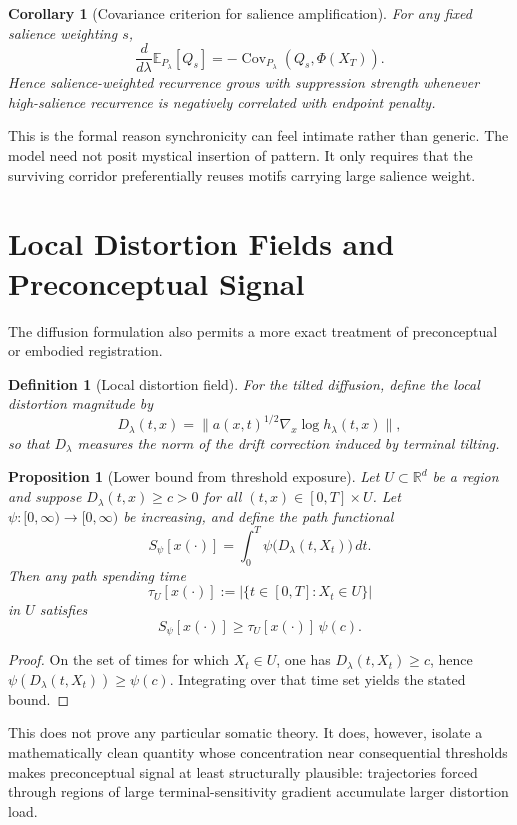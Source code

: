 \documentclass[12pt]{article}
\newtheorem{definition}{Definition}
\newtheorem{proposition}{Proposition}
\newtheorem{corollary}{Corollary}
\begin{document}
\begin{corollary}[Covariance criterion for salience amplification]
For any fixed salience weighting $s$,
\[
\frac{d}{d\lambda}\mathbb E_{P_\lambda}[Q_s]
= -\operatorname{Cov}_{P_\lambda}(Q_s,\Phi(X_T)).
\]
Hence salience-weighted recurrence grows with suppression strength whenever high-salience recurrence is negatively correlated with endpoint penalty.
\end{corollary}

This is the formal reason synchronicity can feel intimate rather than generic. The model need not posit mystical insertion of pattern. It only requires that the surviving corridor preferentially reuses motifs carrying large salience weight.

\section{Local Distortion Fields and Preconceptual Signal}

The diffusion formulation also permits a more exact treatment of preconceptual or embodied registration.

\begin{definition}[Local distortion field]
For the tilted diffusion, define the local distortion magnitude by
\[
D_\lambda(t,x) = \|a(x,t)^{1/2}\nabla_x \log h_\lambda(t,x)\|,
\]
so that $D_\lambda$ measures the norm of the drift correction induced by terminal tilting.
\end{definition}

\begin{proposition}[Lower bound from threshold exposure]
Let $U \subset \mathbb R^d$ be a region and suppose $D_\lambda(t,x) \ge c > 0$ for all $(t,x) \in [0,T]\times U$. Let $\psi:[0,\infty)\to[0,\infty)$ be increasing, and define the path functional
\[
S_\psi[x(\cdot)] = \int_0^T \psi\bigl(D_\lambda(t,X_t)\bigr)\,dt.
\]
Then any path spending time
\[
\tau_U[x(\cdot)] := \bigl|\{t \in [0,T]: X_t \in U\}\bigr|
\]
in $U$ satisfies
\[
S_\psi[x(\cdot)] \ge \tau_U[x(\cdot)]\,\psi(c).
\]
\end{proposition}

\begin{proof}
On the set of times for which $X_t \in U$, one has $D_\lambda(t,X_t) \ge c$, hence $\psi(D_\lambda(t,X_t)) \ge \psi(c)$. Integrating over that time set yields the stated bound.
\end{proof}

This does not prove any particular somatic theory. It does, however, isolate a mathematically clean quantity whose concentration near consequential thresholds makes preconceptual signal at least structurally plausible: trajectories forced through regions of large terminal-sensitivity gradient accumulate larger distortion load.
\end{document}
